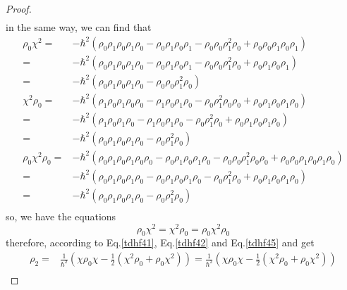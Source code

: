 \begin{proof}
\begin{equation}
\begin{aligned}
      \end{aligned}
    \end{equation}
    in the same way, we can find that
    \begin{equation}
      \begin{aligned}
              \rho_0\chi^2 =& -\hbar^2(\rho_0\rho_1\rho_0\rho_1\rho_0 - \rho_0\rho_1\rho_0\rho_1 -\rho_0\rho_0\rho_1^2\rho_0 + \rho_0\rho_0\rho_1\rho_0\rho_1)\\       \label{tdhf44}
                           =& -\hbar^2(\rho_0\rho_1\rho_0\rho_1\rho_0 - \rho_0\rho_1\rho_0\rho_1 -\rho_0\rho_0\rho_1^2\rho_0 + \rho_0\rho_1\rho_0\rho_1)\\
                           =& -\hbar^2(\rho_0\rho_1\rho_0\rho_1\rho_0 -\rho_0\rho_0\rho_1^2\rho_0)\\
              \chi^2\rho_0 =& -\hbar^2(\rho_1\rho_0\rho_1\rho_0\rho_0 - \rho_1\rho_0\rho_1\rho_0 -\rho_0\rho_1^2\rho_0\rho_0 + \rho_0\rho_1\rho_0\rho_1\rho_0)\\
                           =& -\hbar^2(\rho_1\rho_0\rho_1\rho_0 - \rho_1\rho_0\rho_1\rho_0 -\rho_0\rho_1^2\rho_0 + \rho_0\rho_1\rho_0\rho_1\rho_0)    \\
                           =& -\hbar^2(\rho_0\rho_1\rho_0\rho_1\rho_0 - \rho_0\rho_1^2\rho_0)    \\
         \rho_0\chi^2\rho_0=& -\hbar^2(\rho_0\rho_1\rho_0\rho_1\rho_0\rho_0 - \rho_0\rho_1\rho_0\rho_1\rho_0 - \rho_0\rho_0\rho_1^2\rho_0\rho_0 + \rho_0\rho_0\rho_1\rho_0\rho_1\rho_0)\\
                           =& -\hbar^2(\rho_0\rho_1\rho_0\rho_1\rho_0 - \rho_0\rho_1\rho_0\rho_1\rho_0 - \rho_0\rho_1^2\rho_0 + \rho_0\rho_1\rho_0\rho_1\rho_0)\\
                           =& -\hbar^2(\rho_0\rho_1\rho_0\rho_1\rho_0 - \rho_0\rho_1^2\rho_0)\\
      \end{aligned}
    \end{equation}
    so, we have the equations
    \begin{equation}
      \rho_0\chi^2 = \chi^2\rho_0 = \rho_0\chi^2\rho_0     \label{tdhf45}
    \end{equation}
    therefore, according to Eq.\eqref{tdhf41}, Eq.\eqref{tdhf42} and Eq.\eqref{tdhf45} and get
    \begin{equation}
      \begin{aligned}
      \rho_2 =& \frac{1}{\hbar^2}\left( \chi\rho_0\chi - \frac{1}{2}(\chi^2\rho_0+\rho_0\chi^2) \right) = \frac{1}{\hbar^2}\left( \chi\rho_0\chi - \frac{1}{2}(\chi^2\rho_0+\rho_0\chi^2) \right) \\ \label{tdhf46}

\end{aligned}
\end{equation}
\end{proof}
